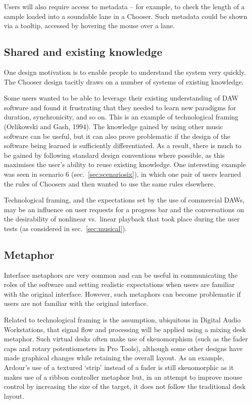 \documentclass{ppig}
\begin{document}
Users will also require access to metadata -- for example, to check the
length of a sample loaded into a soundable lane in a Chooser. Such
metadata could be shown via a tooltip, accessed by hovering the mouse
over a lane.

\hypertarget{sec:shared}{%
\subsection{Shared and existing knowledge}\label{sec:shared}}

One design motivation is to enable people to understand the system very
quickly. The Chooser design tacitly draws on a number of systems of
existing knowledge.

Some users wanted to be able to leverage their existing understanding of
DAW software and found it frustrating that they needed to learn new
paradigms for duration, synchronicity, and so on. This is an example of
technological framing (Orlikowski and Gash, 1994). The knowledge gained
by using other music software can be useful, but it can also prove
problematic if the design of the software being learned is sufficiently
differentiated. As a result, there is much to be gained by following
standard design conventions where possible, as this maximises the user's
ability to reuse existing knowledge. One interesting example was seen in
scenario 6 (sec.~\ref{sec:scenariosix}), in which one pair of users
learned the rules of Choosers and then wanted to use the same rules
elsewhere.

Technological framing, and the expectations set by the use of commercial
DAWs, may be an influence on user requests for a progress bar and the
conversations on the desirability of nonlinear vs.~linear playback that
took place during the user tests (as considered in
sec.~\ref{sec:musical}).

\hypertarget{sec:metaphor}{%
\subsection{Metaphor}\label{sec:metaphor}}

Interface metaphors are very common and can be useful in communicating
the roles of the software and setting realistic expectations when users
are familiar with the original interface. However, such metaphors can
become problematic if users are not familiar with the original
interface.

Related to technological framing is the assumption, ubiquitous in
Digital Audio Workstations, that signal flow and processing will be
applied using a mixing desk metaphor. Such virtual desks often make use
of skeuomorphism (such as the fader caps and rotary potentiometers in
Pro Tools), although some other designs have made graphical changes
while retaining the overall layout. As an example, Ardour's use of a
textured `strip' instead of a fader is still skeuomorphic as it makes
use of a ribbon controller metaphor but, in an attempt to improve mouse
control by increasing the size of the target, it does not follow the
traditional desk layout.
\end{document}
